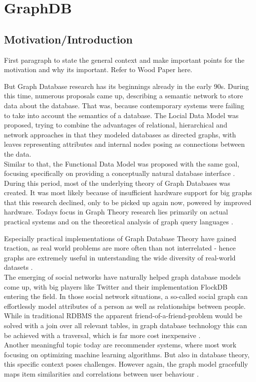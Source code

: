 
\chapter{GraphDB}

\section{Motivation/Introduction}
First paragraph to state the general context and make important points for the motivation and why its important. Refer to Wood Paper here.

But Graph Database research has its beginnings already in the early 90s. During this time, numerous proposals came up, describing a semantic network to store data about the database. That was, because contemporary systems were failing to take into account the semantics of a database.
The Locial Data Model \autocite{KUPERLDM} was proposed, trying to combine the advantages of relational, hierarchical and network approaches in that they modeled databases as directed graphs, with leaves representing attributes and internal nodes posing as connections between the data. \\
Similar to that, the Functional Data Model \autocite{Shipman1979} was proposed with the same goal, focusing specifically on providing a conceptually natural database interface \autocite{Angles2018AnIT}. \\
During this period, most of the underlying theory of Graph Databases was created.
It was most likely because of insufficient hardware support for big graphs that this research declined, only to be picked up again now, powered by improved hardware. Todays focus in Graph Theory research lies primarily on actual practical systems and on the theoretical analysis of graph query languages \autocite{Angles2018AnIT}.

Especially practical implementations of Graph Database Theory have gained traction, as real world problems are more often than not interrelated - hence graphs are extremely useful in unterstanding the wide diversity of real-world datasets \autocite{Robinson2013}. \\
The emerging of social networks have naturally helped graph database models come up, with big players like Twitter and their implementation FlockDB entering the field. In those social network situations, a so-called social graph can effortlessly model attributes of a person as well as relationships between people. While in traditional RDBMS the apparent friend-of-a-friend-problem would be solved with a join over all relevant tables, in graph database technology this can be achieved with a traversal, which is far more cost inexpensive \autocite{Miller2013GraphDA}. \\
Another meaningful topic today are recommender systems, where most work focusing on optimizing machine learning algorithms. But also in database theory, this specific context poses challenges. However again, the graph model gracefully maps item similarities and correlations between user behaviour \autocite{Huang2002}.

